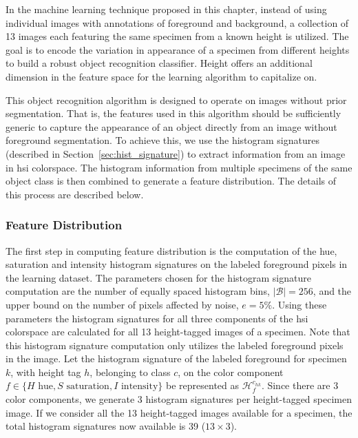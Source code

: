 \documentclass {udthesis}
\begin{document}
In the machine learning technique proposed in this chapter, instead of using individual images with annotations of foreground and background, a collection of 13 images each featuring the same specimen from a known height is utilized. The goal is to encode the variation in appearance of a specimen from different heights to build a robust object recognition classifier. Height offers an additional dimension in the feature space for the learning algorithm to capitalize on.

This object recognition algorithm is designed to operate on images without prior segmentation. That is, the features used in this algorithm should be sufficiently generic to capture the appearance of an object directly from an image without foreground segmentation. To achieve this, we use the histogram signatures (described in Section~\ref{sec:hist_signature}) to extract information from an image in \gls{hsi} colorspace. The histogram information from multiple specimens of the same object class is then combined to generate a feature distribution. The details of this process are described below.

\subsubsection{Feature Distribution}
\label{sec:distdes_feature_distr}

The first step in computing feature distribution is the computation of the hue, saturation and intensity histogram signatures on the labeled foreground pixels in the learning dataset. The parameters chosen for the histogram signature computation are the number of equally spaced histogram bins, $|\mathcal{B}|=256$, and the upper bound on the number of pixels affected by noise, $e=5\%$. Using these parameters the histogram signatures for all three components of the \gls{hsi} colorspace are calculated for all 13 height-tagged images of a specimen. Note that this histogram signature computation only utilizes the labeled foreground pixels in the image. Let the histogram signature of the labeled foreground for specimen $k$, with height tag $h$, belonging to class $c$, on the color component $f\in\{H \text{ hue}, S \text{ saturation}, I \text{ intensity}\}$ be represented as $\mathcal{H}^{c_{hk}}_f$. Since there are 3 color components, we generate 3 histogram signatures per height-tagged specimen image. If we 
consider all the 13 height-tagged images available for a specimen, the total histogram signatures now available is 39 ($13 \times 3$).
\end{document}
